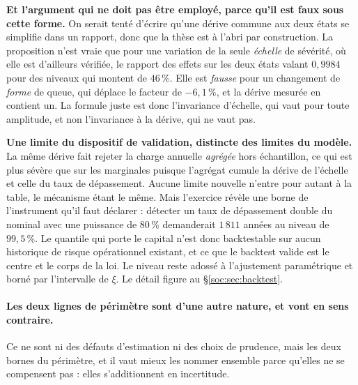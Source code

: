 \vspace{2pt}
\noindent \textbf{Et l'argument qui ne doit pas être employé, parce qu'il est faux sous cette
forme.} On serait tenté d'écrire qu'une dérive commune aux deux états se simplifie dans un
rapport, donc que la thèse est à l'abri par construction. La proposition n'est vraie que pour une
variation de la seule \emph{échelle} de sévérité, où elle est d'ailleurs vérifiée,
le rapport des effets sur les deux états valant $0{,}9984$ pour des niveaux qui montent de
$46\,\%$. Elle est \emph{fausse} pour un changement de \emph{forme} de queue, qui déplace le
facteur de $-6{,}1\,\%$, et la dérive mesurée en contient un. La formule juste est donc
l'invariance d'échelle, qui vaut pour toute amplitude, et non l'invariance à la dérive,
qui ne vaut pas.

\vspace{2pt}
\noindent \textbf{Une limite du dispositif de validation, distincte des limites du modèle.} La
même dérive fait rejeter la charge annuelle \emph{agrégée} hors échantillon, ce qui est plus
sévère que sur les marginales puisque l'agrégat cumule la dérive de l'échelle et celle du taux de
dépassement. Aucune limite nouvelle n'entre pour autant à la table, le mécanisme étant le même.
Mais l'exercice révèle une borne de l'instrument qu'il faut déclarer : détecter un taux de
dépassement double du nominal avec une puissance de $80\,\%$ demanderait $1\,811$ années au
niveau de $99{,}5\,\%$. Le quantile qui porte le capital n'est donc backtestable sur aucun
historique de risque opérationnel existant, et ce que le backtest valide est le centre et le
corps de la loi. Le niveau reste adossé à l'ajustement paramétrique et borné par l'intervalle de
$\xi$. Le détail figure au \S\ref{soc:sec:backtest}.

\paragraph{Les deux lignes de périmètre sont d'une autre nature, et vont en sens contraire.} Ce ne
sont ni des défauts d'estimation ni des choix de prudence, mais les deux bornes du périmètre, et
il vaut mieux les nommer ensemble parce qu'elles ne se compensent pas : elles s'additionnent en
incertitude.

